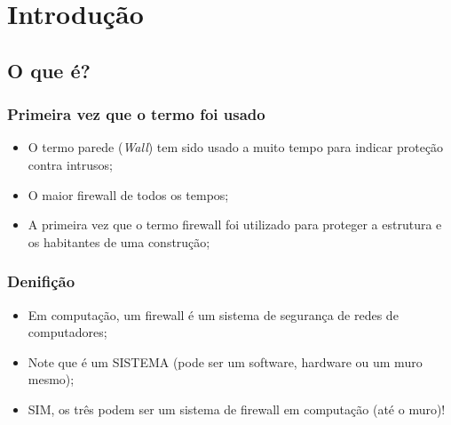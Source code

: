 \section{Introdução} 

\subsection{O que é?} %

\begin{frame}
	\frametitle{Primeira vez que o termo foi usado}

	\begin{itemize}
		\item O termo parede (\textit{Wall}) tem sido usado a muito tempo para indicar proteção contra intrusos;
		\item O maior firewall de todos os tempos;
		\item A primeira vez que o termo firewall foi utilizado para proteger a estrutura e os habitantes de uma construção;
	\end{itemize}

\end{frame}
\begin{frame}
	\frametitle{Denifição}

	\begin{itemize}
		\item Em computação, um firewall é um sistema de segurança de redes de computadores;
		\item Note que é um SISTEMA (pode ser um software, hardware ou um muro mesmo);
		\item SIM, os três podem ser um sistema de firewall em computação (até o muro)!
	\end{itemize}

\end{frame}


\newcommand{\ondefire}[3]{
	\begin{frame}
		\frametitle{#1}
		\begin{figure}
			\centering
			\texttt{[image: imagens/\#3]}
			\caption{#2}
		\end{figure}
	\end{frame}
}

